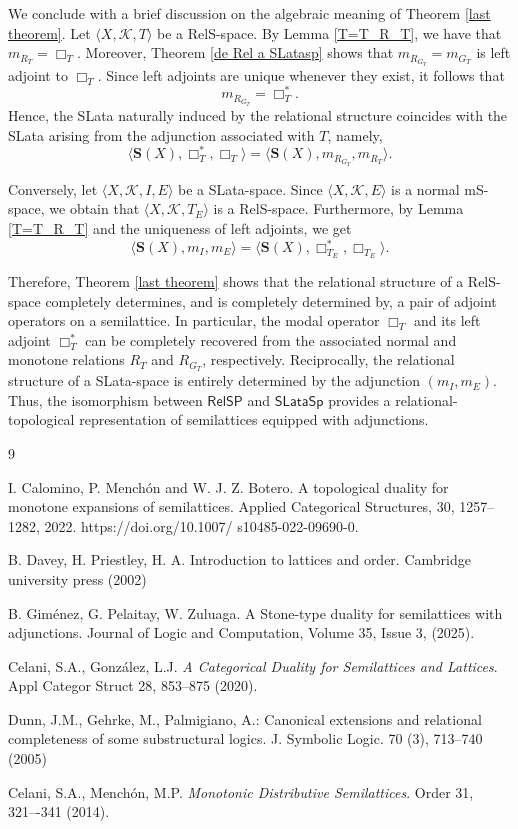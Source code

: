 \documentclass{article}
\begin{document}
We conclude with a brief discussion on the algebraic meaning of Theorem \ref{last theorem}. Let $\langle X, \mathcal{K}, T\rangle$ be a RelS-space. By Lemma \ref{T=T_R_T}, we have that $m_{R_T}=\Box_T$. Moreover, Theorem \ref{de Rel a SLatasp} shows that $m_{R_{G_T}}=m_{G_T}$ is left adjoint to $\Box_T$. Since left adjoints are unique whenever they exist, it follows that
\[
m_{R_{G_T}}=\Box_T^{*}.
\]
Hence, the SLata naturally induced by the relational structure coincides with the SLata arising from the adjunction associated with $T$, namely,
\[
\langle \mathbf{S}(X), \Box_T^{*}, \Box_T \rangle
=
\langle \mathbf{S}(X),m_{R_{G_T}}, m_{R_T}\rangle.
\]

Conversely, let $\langle X, \mathcal{K}, I,E\rangle$ be a SLata-space. Since $\langle X, \mathcal{K}, E\rangle$ is a normal mS-space, we obtain that $\langle X, \mathcal{K}, T_E\rangle$ is a RelS-space. Furthermore, by Lemma \ref{T=T_R_T} and the uniqueness of left adjoints, we get
\[
\langle \mathbf{S}(X), m_I, m_E \rangle
=
\langle \mathbf{S}(X), \Box_{T_E}^{*}, \Box_{T_E} \rangle.
\]

Therefore, Theorem \ref{last theorem} shows that the relational structure of a RelS-space completely determines, and is completely determined by, a pair of adjoint operators on a semilattice. In particular, the modal operator $\Box_T$ and its left adjoint $\Box_T^{*}$ can be completely recovered from the associated normal and monotone relations $R_T$ and $R_{G_T}$, respectively. Reciprocally, the relational structure of a SLata-space is entirely determined by the adjunction $(m_I,m_E)$. Thus, the isomorphism between $\mathsf{RelSP}$ and $\mathsf{SLataSp}$ provides a relational-topological representation of semilattices equipped with adjunctions.




\begin{thebibliography}{9}

 I. Calomino, P. Menchón and W. J. Z. Botero. A topological duality for monotone expansions of semilattices. Applied Categorical Structures, 30, 1257–1282, 2022. https://doi.org/10.1007/
s10485-022-09690-0.

 B. Davey, H. Priestley, H. A. Introduction to lattices and order. Cambridge university press (2002)

B. Giménez, G. Pelaitay, W. Zuluaga.  
A Stone-type duality for semilattices with adjunctions.  
Journal of Logic and Computation, Volume 35, Issue 3, (2025).


 Celani, S.A., González, L.J. \textit{A Categorical Duality for Semilattices and Lattices}. Appl Categor Struct 28, 853–875 (2020).

 Dunn, J.M., Gehrke, M., Palmigiano, A.: Canonical extensions and relational
completeness of some substructural logics. J. Symbolic Logic. 70 (3), 713--740 (2005)

 Celani, S.A., Menchón, M.P. \textit{Monotonic Distributive Semilattices}. Order 31, 321–-341 (2014).
\end{thebibliography}
\end{document}

